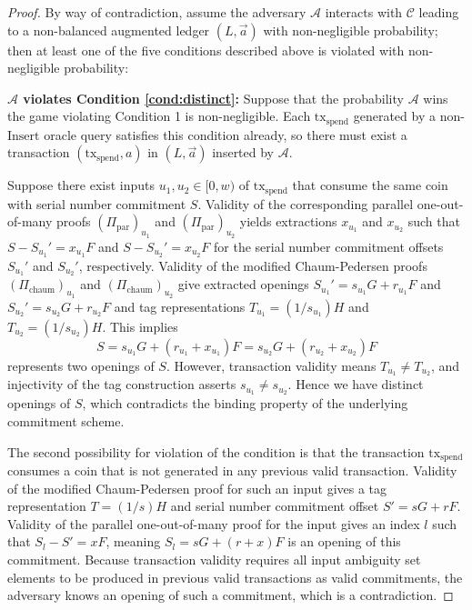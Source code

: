\documentclass{llncs}
\begin{document}
\begin{proof}
By way of contradiction, assume the adversary $\mathcal{A}$ interacts with $\mathcal{C}$ leading to a non-balanced augmented ledger $(L, \vec{a})$ with non-negligible probability; then at least one of the five conditions described above is violated with non-negligible probability:

\textbf{$\mathcal{A}$ violates Condition \ref{cond:distinct}:} Suppose that the probability $\mathcal{A}$ wins the game violating Condition 1 is non-negligible.
Each $\text{tx}_{\text{spend}}$ generated by a non-$\text{Insert}$ oracle query satisfies this condition already, so there must exist a transaction $(\text{tx}_{\text{spend}}, a)$ in $(L, \vec{a})$ inserted by $\mathcal{A}$.

Suppose there exist inputs $u_1,u_2 \in [0,w)$ of $\text{tx}_{\text{spend}}$ that consume the same coin with serial number commitment $S$.
Validity of the corresponding parallel one-out-of-many proofs $(\Pi_{\text{par}})_{u_1}$ and $(\Pi_{\text{par}})_{u_2}$ yields extractions $x_{u_1}$ and $x_{u_2}$ such that $S - S_{u_1}' = x_{u_1} F$ and $S - S_{u_2}' = x_{u_2} F$ for the serial number commitment offsets $S_{u_1}'$ and $S_{u_2}'$, respectively.
Validity of the modified Chaum-Pedersen proofs $(\Pi_{\text{chaum}})_{u_1}$ and $(\Pi_{\text{chaum}})_{u_2}$ give extracted openings $S_{u_1}' = s_{u_1} G + r_{u_1} F$ and $S_{u_2}' = s_{u_2} G + r_{u_2} F$ and tag representations $T_{u_1} = (1/s_{u_1})H$ and $T_{u_2} = (1/s_{u_2})H$.
This implies $$S = s_{u_1}G + (r_{u_1} + x_{u_1})F = s_{u_2}G + (r_{u_2} + x_{u_2})F$$ represents two openings of $S$.
However, transaction validity means $T_{u_1} \neq T_{u_2}$, and injectivity of the tag construction asserts $s_{u_1} \neq s_{u_2}$.
Hence we have distinct openings of $S$, which contradicts the binding property of the underlying commitment scheme.

The second possibility for violation of the condition is that the transaction $\text{tx}_{\text{spend}}$ consumes a coin that is not generated in any previous valid transaction.
Validity of the modified Chaum-Pedersen proof for such an input gives a tag representation $T = (1/s)H$ and serial number commitment offset $S' = sG + rF$.
Validity of the parallel one-out-of-many proof for the input gives an index $l$ such that $S_l - S' = xF$, meaning $S_l = sG + (r + x)F$ is an opening of this commitment.
Because transaction validity requires all input ambiguity set elements to be produced in previous valid transactions as valid commitments, the adversary knows an opening of such a commitment, which is a contradiction.


\end{proof}
\end{document}
